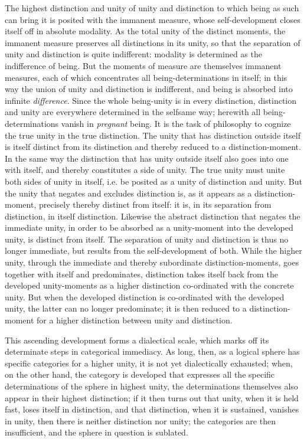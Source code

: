 \documentclass[12pt,a4paper,openany]{book}
\newcommand{\opage}[1]{\marginnote{\footnotesize\textit{[#1]}}}
\begin{document}
The highest distinction and unity of unity and distinction to which being as such can bring it is posited with the immanent measure, whose self-development closes itself off in absolute modality. As the total unity of the distinct moments, the immanent measure preserves all distinctions in its unity, so that the separation of unity and distinction is quite indifferent: modality is determined as the indifference of being. But the moments of measure are themselves immanent
\setcounter{footnote}{0}%
\opage{71}measures, each of which concentrates all being-determinations in itself; in this way the union of unity and distinction is indifferent, and being is absorbed into infinite \emph{difference}. Since the whole being-unity is in every distinction, distinction and unity are everywhere determined in the selfsame way; herewith all being-determinations vanish in \emph{pregnant} being.
It is the task of philosophy to cognize the true unity in the true distinction. The unity that has distinction outside itself is itself distinct from its distinction and thereby reduced to a distinction-moment. In the same way the distinction that has unity outside itself also goes into one with itself, and thereby constitutes a side of unity. The true unity must unite both sides of unity in itself, i.e. be posited as a unity of distinction and unity. But the unity that negates and excludes distinction is, as it appears as a distinction-moment, precisely thereby distinct from itself: it is, in its separation from distinction, in itself distinction. Likewise the abstract distinction that negates the immediate unity, in order to be absorbed as a unity-moment into the developed unity, is distinct from itself.
The separation of unity and distinction is thus no longer immediate, but results from the self-development of both. While the higher unity, through the immediate and thereby subordinate distinction-moments, goes together with itself and predominates, distinction takes itself back from the developed unity-moments as a higher distinction co-ordinated with the concrete unity.
But when the developed distinction is co-ordinated with
\setcounter{footnote}{0}%
\opage{72}the developed unity, the latter can no longer predominate; it is then reduced to a distinction-moment for a higher distinction between unity and distinction.

This ascending development forms a dialectical scale, which marks off its determinate steps in categorical immediacy. As long, then, as a logical sphere has specific categories for a higher unity, it is not yet dialectically exhausted; when, on the other hand, the category is developed that expresses all the specific determinations of the sphere in highest unity, the determinations themselves also appear in their highest distinction; if it then turns out that unity, when it is held fast, loses itself in distinction, and that distinction, when it is sustained, vanishes in unity, then there is neither distinction nor unity; the categories are then insufficient, and the sphere in question is sublated.
\end{document}
